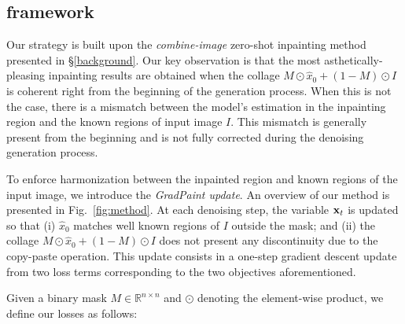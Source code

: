 \subsection{\acro{} framework}





Our strategy is built upon the \textit{combine-image} zero-shot inpainting method presented in \S\ref{background}. Our key observation is that the most asthetically-pleasing inpainting results are obtained when the collage $M \odot \hat{x}_0 + (1-M) \odot I$ is coherent right from the beginning of the generation process. When this is not the case, there is a mismatch between the model's estimation in the inpainting region and the known regions of input image $I$. This mismatch is generally present from the beginning and is not fully corrected during the denoising generation process. 

To enforce harmonization between the inpainted region and known regions of the input image, we introduce the \textit{GradPaint update}. An overview of our method is presented in Fig.~\ref{fig:method}.
At each denoising step, the variable $\mathbf{x}_t$ is updated so that (i) $\hat{x}_0$ matches well known regions of $I$ outside the mask; and (ii) the collage $M \odot \hat{x}_0 + (1-M) \odot I$ does not present any discontinuity due to the copy-paste operation. This update consists in a one-step gradient descent update from two loss terms corresponding to the two objectives aforementioned. %




Given a binary mask $M \in \mathbb{R}^{n \times n}$ and $\odot$ denoting the element-wise product, we define our losses as follows:


